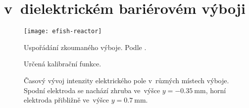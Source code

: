 \chapter[\EFISH]{{\EFISH} v~dielektrickém bariérovém výboji}

\newcommand\ypos{y}

\begin{figure}
	\texttt{[image: efish-reactor]}
	\caption{Uspořádání zkoumaného výboje. Podle \cite{efish-nitrogen}.}
\end{figure}

\begin{figure}
	
	\caption{Určená kalibrační funkce.}
\end{figure}

\begin{figure}[p]
	\makebox[\textwidth]{}
	\caption{Časový vývoj intenzity elektrického pole
		v~různých místech výboje.
		Spodní elektroda se nachází zhruba ve~výšce
		$\ypos = \SI{-0.35}{\milli\metre}$,
		horní elektroda přibližně ve~výšce
		$\ypos = \SI{0.7}{\milli\metre}$.}
\end{figure}
